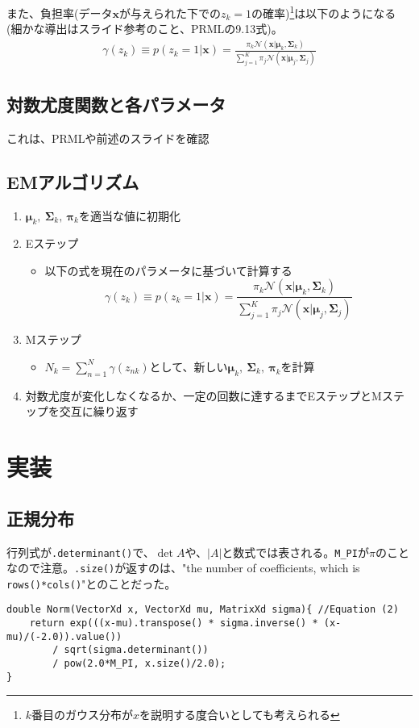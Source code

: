 \documentclass[a4paper,10.5pt]{jsarticle}  %
\begin{document}
また、負担率(データ$\mathbf{x}$が与えられた下での$z_k=1$の確率)\footnote{$k$番目のガウス分布が$x$を説明する度合いとしても考えられる}は以下のようになる (細かな導出はスライド参考のこと、PRMLの9.13式)。
\begin{align}
	\gamma(z_k) \equiv p(z_k=1 | \mathbf{x}) = \frac{\pi_k \mathcal{N}(\mathbf{x}|\boldsymbol{\mu}_k, \boldsymbol{\Sigma}_k)}{\sum_{j=1}^{K} \pi_j \mathcal{N}(\mathbf{x}|\boldsymbol{\mu}_j, \boldsymbol{\Sigma}_j)}
\end{align}

\subsection{対数尤度関数と各パラメータ}
これは、PRMLや前述のスライドを確認

\subsection{EMアルゴリズム}
\begin{enumerate}
	\item $\boldsymbol{\mu}_k,\ \boldsymbol{\Sigma}_k,\ \boldsymbol{\pi}_k$を適当な値に初期化
	\item Eステップ
		\begin{itemize}
			\item 以下の式を現在のパラメータに基づいて計算する $$\gamma(z_k) \equiv p(z_k=1 | \mathbf{x}) = \frac{\pi_k \mathcal{N}(\mathbf{x}|\boldsymbol{\mu}_k, \boldsymbol{\Sigma}_k)}{\sum_{j=1}^{K} \pi_j \mathcal{N}(\mathbf{x}|\boldsymbol{\mu}_j, \boldsymbol{\Sigma}_j)}$$
		\end{itemize}
	\item Mステップ
		\begin{itemize}
			\item $N_k = \sum_{n=1}^{N} \gamma (z_{nk}) $として、新しい$\boldsymbol{\mu}_k,\ \boldsymbol{\Sigma}_k,\ \boldsymbol{\pi}_k$を計算
		\end{itemize}
	\item 対数尤度が変化しなくなるか、一定の回数に達するまでEステップとMステップを交互に繰り返す
\end{enumerate}

\section{実装}

\subsection{正規分布}
行列式が\texttt{.determinant()}で、$\det A$や、$|A|$と数式では表される。\texttt{M\_PI}が$\pi$のことなので注意。\texttt{.size()}が返すのは、"the number of coefficients, which is \texttt{rows()*cols()}"とのことだった。
\begin{lstlisting}
double Norm(VectorXd x, VectorXd mu, MatrixXd sigma){ //Equation (2)
    return exp(((x-mu).transpose() * sigma.inverse() * (x-mu)/(-2.0)).value()) 
        / sqrt(sigma.determinant())
        / pow(2.0*M_PI, x.size()/2.0);
}
\end{lstlisting}
\end{document}
